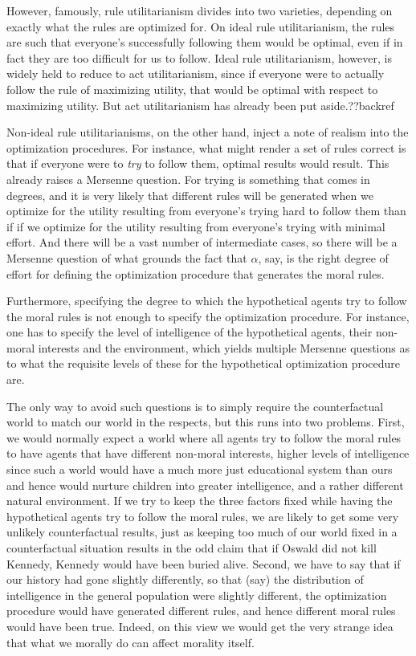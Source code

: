However, famously, rule utilitarianism divides into two varieties, depending on exactly what the rules are optimized for.
On ideal rule utilitarianism, the rules are such that everyone's successfully following them would be optimal, even if in
fact they are too difficult for us to follow. Ideal rule utilitarianism, however, is widely held to reduce to act
utilitarianism, since if everyone were to actually follow the rule of maximizing utility, that would be optimal
with respect to maximizing utility. But act utilitarianism has already been put aside.??backref

Non-ideal rule utilitarianisms, on the other hand, inject a note of realism into the optimization procedures. For instance,
what might render a set of rules correct is that if everyone were to \textit{try} to follow them, optimal results would
result. This already raises a Mersenne question. For trying is something that comes in degrees, and it is very likely that
different rules will be generated when we optimize for the utility resulting from everyone's trying hard to follow them
than if if we optimize for the utility resulting from everyone's trying with minimal effort. And there will be a vast
number of intermediate cases, so there will be a Mersenne question of what grounds the fact that $\alpha$, say, is
the right degree of effort for defining the optimization procedure that generates the moral rules.

Furthermore, specifying the degree to which the hypothetical agents try to follow the moral rules is not enough to specify the
optimization procedure. For instance, one has to specify the level of intelligence of the hypothetical agents, their non-moral 
interests and the environment, which yields multiple Mersenne questions as to what the requisite levels of these for the 
hypothetical optimization procedure are. 

The only way to avoid such questions is to  simply require the counterfactual world to match our
world in the respects, but this runs into two problems.
First, we would normally expect a world where all agents try to follow the moral rules to have agents that have different non-moral
interests, higher levels of intelligence since such a world would have a much more just educational system
than ours and hence would nurture children into greater intelligence, and a rather different natural environment. If we try
to keep the three factors fixed while having the hypothetical agents try to follow the moral rules, we are likely to get
some very unlikely counterfactual results, just as keeping too much of our world fixed in a counterfactual situation
results in the odd claim that if Oswald did not kill Kennedy, Kennedy would have been buried alive. 
Second, we have to say that if our history had gone slightly differently, so that (say) the distribution of intelligence in the
general population were slightly different, the optimization procedure would have generated different rules, and hence different
moral rules would have been true. Indeed, on this view we would get the very strange idea that what we morally do can affect morality
itself.

